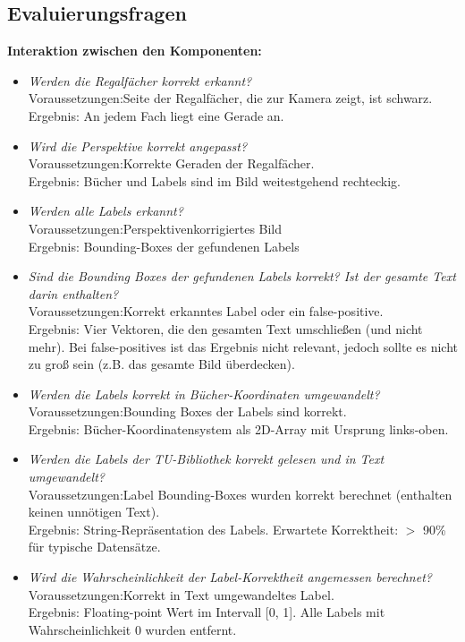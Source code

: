 \documentclass[paper=A4, deutsch]{scrartcl}
\newcommand\tab[1][1cm]{\hspace*{#1}}
\begin{document}
\subsection{Evaluierungsfragen}
\textbf{Interaktion zwischen den Komponenten:}
\begin{itemize}
	\item \textit{Werden die Regalfächer korrekt erkannt?}\\
		  Voraussetzungen:\tab Seite der Regalfächer, die zur Kamera zeigt, ist schwarz.\\
		  Ergebnis:\tab[2.2cm] An jedem Fach liegt eine Gerade an.
	\item \textit{Wird die Perspektive korrekt angepasst?}\\
		  Voraussetzungen:\tab Korrekte Geraden der Regalfächer.\\
		  Ergebnis:\tab[2.2cm] Bücher und Labels sind im Bild weitestgehend rechteckig.
	\item \textit{Werden alle Labels erkannt?}\\
		  Voraussetzungen:\tab Perspektivenkorrigiertes Bild\\
		  Ergebnis:\tab[2.2cm] Bounding-Boxes der gefundenen Labels
	\item \textit{Sind die Bounding Boxes der gefundenen Labels korrekt? Ist der gesamte Text darin enthalten?}\\
		  Voraussetzungen:\tab Korrekt erkanntes Label oder ein false-positive.\\
		  Ergebnis:\tab[2.2cm] Vier Vektoren, die den gesamten Text umschließen (und nicht mehr). Bei false-positives ist das Ergebnis nicht relevant, jedoch sollte es nicht zu groß sein (z.B. das gesamte Bild überdecken).
	\item \textit{Werden die Labels korrekt in Bücher-Koordinaten umgewandelt?}\\
		  Voraussetzungen:\tab Bounding Boxes der Labels sind korrekt.\\
		  Ergebnis:\tab[2.2cm] Bücher-Koordinatensystem als 2D-Array mit Ursprung links-oben.
	\item \textit{Werden die Labels der TU-Bibliothek korrekt gelesen und in Text umgewandelt?}\\
		  Voraussetzungen:\tab Label Bounding-Boxes wurden korrekt berechnet (enthalten keinen unnötigen Text).\\
		  Ergebnis:\tab[2.2cm] String-Repräsentation des Labels. Erwartete Korrektheit: $>$ 90\% für typische Datensätze.
	\item \textit{Wird die Wahrscheinlichkeit der Label-Korrektheit angemessen berechnet?}\\
		  Voraussetzungen:\tab Korrekt in Text umgewandeltes Label.\\
		  Ergebnis:\tab[2.2cm] Floating-point Wert im Intervall [0, 1]. Alle Labels mit Wahrscheinlichkeit 0 wurden entfernt.
\end{itemize}
\end{document}
